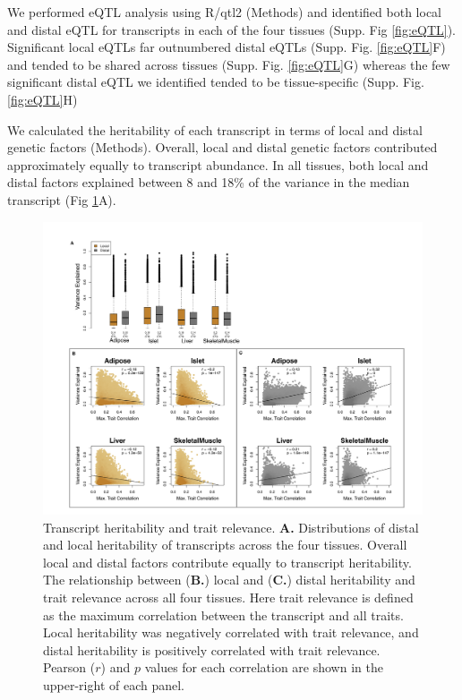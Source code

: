\documentclass[
]{article}
\begin{document}
We performed eQTL analysis using R/qtl2 \cite{pmid30591514} (Methods)
and identified both local and distal eQTL for transcripts in each of the
four tissues (Supp. Fig \ref{fig:eQTL}). Significant local eQTLs far
outnumbered distal eQTLs (Supp. Fig. \ref{fig:eQTL}F) and tended to be
shared across tissues (Supp. Fig. \ref{fig:eQTL}G) whereas the few
significant distal eQTL we identified tended to be tissue-specific
(Supp. Fig. \ref{fig:eQTL}H)

We calculated the heritability of each transcript in terms of local and
distal genetic factors (Methods). Overall, local and distal genetic
factors contributed approximately equally to transcript abundance. In
all tissues, both local and distal factors explained between 8 and 18\%
of the variance in the median transcript (Fig \ref{fig:motivation}A).

\begin{figure}[ht!]
\includegraphics[width=\textwidth]{Figures/Fig2_motivation.pdf} 
\caption{Transcript heritability and trait relevance. 
\textbf{A.} Distributions of distal and local heritability of 
transcripts across the four tissues. Overall local and distal 
factors contribute equally to transcript heritability. The 
relationship between (\textbf{B.}) local and (\textbf{C.}) 
distal heritability and trait relevance across all four tissues. 
Here trait relevance is defined as the maximum correlation between 
the transcript and all traits. Local heritability was negatively 
correlated with trait relevance, and distal heritability is 
positively correlated with trait relevance. Pearson ($r$) and $p$ 
values for each correlation are shown in the upper-right of each panel.}
\label{fig:motivation}
\end{figure}
\end{document}

